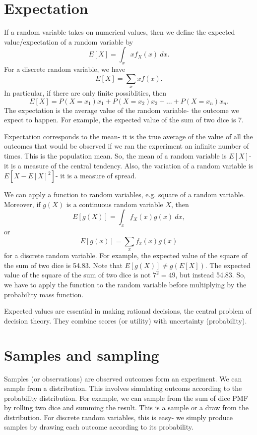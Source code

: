 \documentclass[a4paper, openany]{memoir}
\begin{document}
\section{Expectation}
If a random variable takes on numerical values, then we define the  expected value/expectation of a random variable by
\[E[X] = \int_x xf_X(x) \ dx.\]
For a discrete random variable, we have
\[E[X] = \sum_x xf(x).\]
In particular, if there are only finite possiblities, then
\[E[X] = P(X = x_1) x_1 + P(X = x_2) x_2 + \dots + P(X = x_n) x_n.\]
The expectation is the average value of the random variable- the outcome we expect to happen. For example, the expected value of the sum of two dice is 7.

Expectation corresponds to the mean- it is the true average of the value of all the outcomes that would be observed if we ran the experiment an infinite number of times. This is the population mean. So, the mean of a random variable is $E[X]$- it is a measure of the central tendency. Also, the variation of a random variable is $E[X - E[X]^2]$- it is a measure of spread.

We can apply a function to random variables, e.g. square of a random variable. Moreover, if $g(X)$ is a continuous random variable $X$, then
\[E[g(X)] = \int_x f_X(x) g(x) \ dx,\]
or
\[E[g(x)] = \sum_x f_x(x) g(x)\]
for a discrete random variable. For example, the expected value of the square of the sum of two dice is 54.83. Note that $E[g(X)] \neq g(E[X])$. The expected value of the square of the sum of two dice is not $7^2 = 49$, but instead 54.83. So, we have to apply the function to the random variable before multiplying by the probability mass function.


Expected values are essential in making rational decisions, the central problem of decision theory. They combine scores (or utility) with uncertainty (probability).
\newpage

\section{Samples and sampling}
Samples (or observations) are observed outcomes form an experiment. We can sample from a distribution. This involves simulating outcoms according to the probability distribution. For example, we can sample from the sum of dice PMF by rolling two dice and summing the result. This is a sample or a draw from the distribution. For discrete random variables, this is easy- we simply produce samples by drawing each outcome according to its probability.
\end{document}
